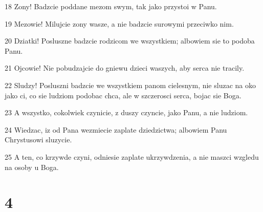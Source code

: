 \par 18 Zony! Badzcie poddane mezom swym, tak jako przystoi w Panu.
\par 19 Mezowie! Milujcie zony wasze, a nie badzcie surowymi przeciwko nim.
\par 20 Dziatki! Posluszne badzcie rodzicom we wszystkiem; albowiem sie to podoba Panu.
\par 21 Ojcowie! Nie pobudzajcie do gniewu dzieci waszych, aby serca nie tracily.
\par 22 Sludzy! Posluszni badzcie we wszystkiem panom cielesnym, nie sluzac na oko jako ci, co sie ludziom podobac chca, ale w szczerosci serca, bojac sie Boga.
\par 23 A wszystko, cokolwiek czynicie, z duszy czyncie, jako Panu, a nie ludziom.
\par 24 Wiedzac, iz od Pana wezmiecie zaplate dziedzictwa; albowiem Panu Chrystusowi sluzycie.
\par 25 A ten, co krzywde czyni, odniesie zaplate ukrzywdzenia, a nie maszci wzgledu na osoby u Boga.

\chapter{4}

